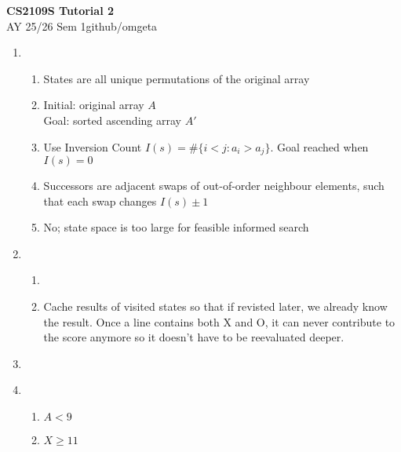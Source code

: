 \documentclass[12pt, a4paper]{article}
\newcommand{\mytitle}{CS2109S Tutorial 2}
\newcommand{\myauthor}{github/omgeta}
\newcommand{\mydate}{AY 25/26 Sem 1}
\begin{document}
\raggedright
\footnotesize
\begin{center}
{\normalsize{\textbf{\mytitle}}} \\
{\footnotesize{\mydate\hspace{2pt}\textemdash\hspace{2pt}\myauthor}}
\end{center}
\begin{enumerate}[\Alph*.]
  \item 
    \begin{enumerate}[\arabic*.]
      \item States are all unique permutations of the original array
      \item Initial: original array $A$\\
        Goal: sorted ascending array $A'$
      \item Use Inversion Count $I(s) = \#\{i < j: a_i > a_j\}$. Goal reached when $I(s) = 0$
      \item Successors are adjacent swaps of out-of-order neighbour elements, such that each swap changes $I(s) \pm 1$
      \item No; state space is too large for feasible informed search 
    \end{enumerate}

  \item 
    \begin{enumerate}[\arabic*.]
      \item \quad\\

      \item Cache results of visited states so that if revisted later, we already know the result. Once a line contains both X and O, it can never contribute to the score anymore so it doesn't have to be reevaluated deeper. 
    \end{enumerate}

    \item \quad\\

    \item 
      \begin{enumerate}[\arabic*.]
        \item $A < 9$
        \item $X \geq 11$
      \end{enumerate}
\end{enumerate}
\end{document}
